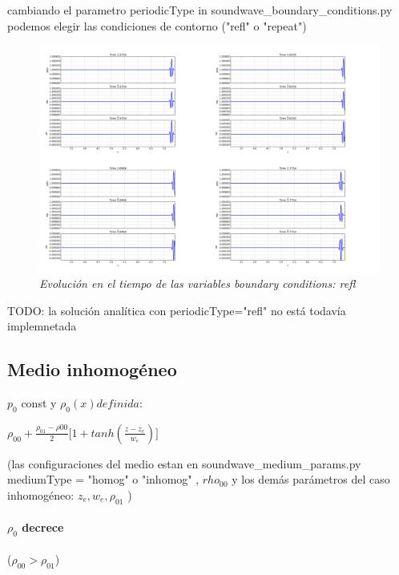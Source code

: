 \documentclass{article}
\begin{document}
\begin{description}
\item cambiando el parametro periodicType in soundwave\_boundary\_conditions.py  podemos  elegir las condiciones de contorno ("refl" o "repeat")
\item
\begin{figure}[!ht]
 \centering
 \includegraphics[scale=0.2]{reflhom.png}
 \caption{\emph{Evolución en el tiempo de las variables boundary conditions: refl }}
\end{figure}
\item TODO: la solución analítica con periodicType="refl" no está todavía implemnetada
\end{description}

\subsection{Medio inhomogéneo}
$p_0 $ const y $\rho_0(x) definida:$
\begin{center}
	$\rho_{00} + \frac{\rho_{01}-\rho{00}}{2}\big[ 1 + tanh(\frac{z-z_e}{w_e})\big] $
\end{center}

({\small las configuraciones del medio estan en soundwave\_medium\_params.py mediumType = "homog" o "inhomog" , $rho_{00}$ y 
los demás parámetros del caso inhomogéneo: $z_e, w_e, \rho_{01}$ })

\newpage
\paragraph{$\rho_0$ decrece }($\rho_{00} > \rho_{01} $)
\end{document}
